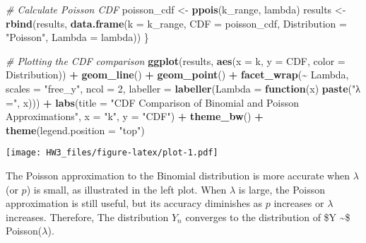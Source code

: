 \documentclass[
]{article}
\newenvironment{Shaded}{\begin{snugshade}}{\end{snugshade}}
\newcommand{\AttributeTok}[1]{\textcolor[rgb]{0.13,0.29,0.53}{#1}}
\newcommand{\CommentTok}[1]{\textcolor[rgb]{0.56,0.35,0.01}{\textit{#1}}}
\newcommand{\ControlFlowTok}[1]{\textcolor[rgb]{0.13,0.29,0.53}{\textbf{#1}}}
\newcommand{\DecValTok}[1]{\textcolor[rgb]{0.00,0.00,0.81}{#1}}
\newcommand{\FunctionTok}[1]{\textcolor[rgb]{0.13,0.29,0.53}{\textbf{#1}}}
\newcommand{\NormalTok}[1]{#1}
\newcommand{\OtherTok}[1]{\textcolor[rgb]{0.56,0.35,0.01}{#1}}
\newcommand{\SpecialCharTok}[1]{\textcolor[rgb]{0.81,0.36,0.00}{\textbf{#1}}}
\newcommand{\StringTok}[1]{\textcolor[rgb]{0.31,0.60,0.02}{#1}}
\begin{document}
\begin{Shaded}
\begin{Highlighting}[]
  \CommentTok{\# Calculate Poisson CDF}
\NormalTok{  poisson\_cdf }\OtherTok{\textless{}{-}} \FunctionTok{ppois}\NormalTok{(k\_range, lambda)}
\NormalTok{  results }\OtherTok{\textless{}{-}} \FunctionTok{rbind}\NormalTok{(results, }\FunctionTok{data.frame}\NormalTok{(}\AttributeTok{k =}\NormalTok{ k\_range, }\AttributeTok{CDF =}\NormalTok{ poisson\_cdf, }\AttributeTok{Distribution =} \StringTok{"Poisson"}\NormalTok{, }\AttributeTok{Lambda =}\NormalTok{ lambda))}
\NormalTok{\}}

\CommentTok{\# Plotting the CDF comparison}
\FunctionTok{ggplot}\NormalTok{(results, }\FunctionTok{aes}\NormalTok{(}\AttributeTok{x =}\NormalTok{ k, }\AttributeTok{y =}\NormalTok{ CDF, }\AttributeTok{color =}\NormalTok{ Distribution)) }\SpecialCharTok{+}
  \FunctionTok{geom\_line}\NormalTok{() }\SpecialCharTok{+}
  \FunctionTok{geom\_point}\NormalTok{() }\SpecialCharTok{+}
  \FunctionTok{facet\_wrap}\NormalTok{(}\SpecialCharTok{\textasciitilde{}}\NormalTok{ Lambda, }\AttributeTok{scales =} \StringTok{"free\_y"}\NormalTok{, }\AttributeTok{ncol =} \DecValTok{2}\NormalTok{, }\AttributeTok{labeller =} \FunctionTok{labeller}\NormalTok{(}\AttributeTok{Lambda =} \ControlFlowTok{function}\NormalTok{(x) }\FunctionTok{paste}\NormalTok{(}\StringTok{"λ ="}\NormalTok{, x))) }\SpecialCharTok{+}
  \FunctionTok{labs}\NormalTok{(}\AttributeTok{title =} \StringTok{"CDF Comparison of Binomial and Poisson Approximations"}\NormalTok{,}
       \AttributeTok{x =} \StringTok{"k"}\NormalTok{, }\AttributeTok{y =} \StringTok{"CDF"}\NormalTok{) }\SpecialCharTok{+}
  \FunctionTok{theme\_bw}\NormalTok{() }\SpecialCharTok{+}
  \FunctionTok{theme}\NormalTok{(}\AttributeTok{legend.position =} \StringTok{"top"}\NormalTok{)}
\end{Highlighting}
\end{Shaded}

\texttt{[image: HW3\_files/figure-latex/plot-1.pdf]}

The Poisson approximation to the Binomial distribution is more accurate
when \(\lambda\) (or \(p\)) is small, as illustrated in the left plot.
When \(\lambda\) is large, the Poisson approximation is still useful,
but its accuracy diminishes as \(p\) increases or \(\lambda\) increases.
Therefore, The distribution \(Y_n\) converges to the distribution of \$Y
\sim \$ Poisson(\(\lambda\)).
\end{document}
